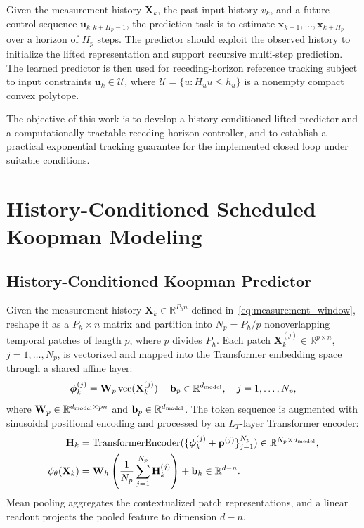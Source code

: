 \documentclass[journal]{IEEEtran}
\newcommand{\vphi}{\boldsymbol{\phi}}
\newcommand{\vp}{\mathbf{p}}
\newcommand{\vb}{\mathbf{b}}
\newcommand{\vx}{\mathbf{x}}
\newcommand{\vu}{\mathbf{u}}
\newcommand{\mH}{\mathbf{H}}
\newcommand{\mW}{\mathbf{W}}
\newcommand{\mX}{\mathbf{X}}
\newcommand{\R}{\mathbb{R}}
\begin{document}
Given the measurement history $\mX_k$, the past-input history $v_k$, and a future control sequence $\vu_{k:k+H_p-1}$, the prediction task is to estimate $\vx_{k+1},\ldots,\vx_{k+H_p}$ over a horizon of $H_p$ steps. The predictor should exploit the observed history to initialize the lifted representation and support recursive multi-step prediction. The learned predictor is then used for receding-horizon reference tracking subject to input constraints $\vu_k\in\mathcal U$, where $\mathcal U=\{u:H_uu\leq h_u\}$ is a nonempty compact convex polytope.

The objective of this work is to develop a history-conditioned lifted predictor and a computationally tractable receding-horizon controller, and to establish a practical exponential tracking guarantee for the implemented closed loop under suitable conditions.

\section{History-Conditioned Scheduled Koopman Modeling}
\label{sec:model}
\subsection{History-Conditioned Koopman Predictor}
\label{sec:temporal_lifting}
Given the measurement history $\mX_k\in\R^{P_hn}$ defined in~\eqref{eq:measurement_window}, reshape it as a $P_h\times n$ matrix and partition into $N_p=P_h/p$ nonoverlapping temporal patches of length $p$, where $p$ divides $P_h$. Each patch $\mX_k^{(j)}\in\R^{p\times n}$, $j=1,\ldots,N_p$, is vectorized and mapped into the Transformer embedding space through a shared affine layer:
\begin{equation}
\vphi_k^{(j)}=\mW_p\operatorname{vec}(\mX_k^{(j)})+\vb_p\in\R^{d_{\rm model}},
\quad j=1,\ldots,N_p,
\label{eq:patch_embedding}
\end{equation}
where $\mW_p\in\R^{d_{\rm model}\times pn}$ and $\vb_p\in\R^{d_{\rm model}}$.
The token sequence is augmented with sinusoidal positional encoding \cite{vaswani2017attention} and processed by an $L_T$-layer Transformer encoder:
\begin{align}
\mH_k&=\operatorname{TransformerEncoder}
  (\{\vphi_k^{(j)}+\vp^{(j)}\}_{j=1}^{N_p})\in\R^{N_p\times d_{\rm model}},\label{eq:transformer_enc}\\
\psi_\theta(\mX_k)&=\mW_h\left(\frac1{N_p}\sum_{j=1}^{N_p}\mH_k^{(j)}\right)+\vb_h\in\R^{d-n}.
\label{eq:history_feature}
\end{align}
Mean pooling aggregates the contextualized patch representations, and a linear readout projects the pooled feature to dimension $d-n$.
\end{document}
